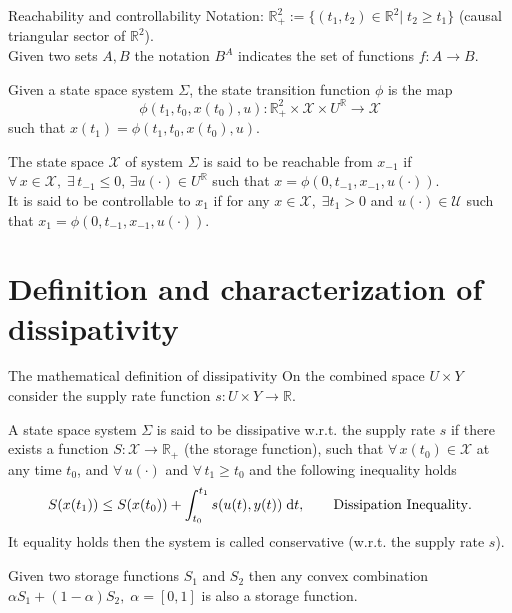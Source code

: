 \documentclass[aspectratio=169]{beamer}
\newcommand{\bbR}{\mathbb{R}}
\begin{document}
\begin{frame}{Reachability and controllability}
	Notation:
	$\bbR^2_+:=\{(t_1, t_2) \in \bbR^2 |\;  t_2\ge t_1\}$ (causal triangular sector of $\bbR^2$). \\
	Given two sets $A, B$ the notation $B^A$ indicates the set of functions $f: A \rightarrow B$. \\
	\begin{definition}
		Given a state space system $\Sigma$, the state transition function $\phi$ is the map 
		\begin{equation*}
			\phi(t_1, t_0, x(t_0), u) : \bbR_+^2 \times \mathcal{X} \times U^\bbR \rightarrow \mathcal{X}
		\end{equation*}
		such that $x(t_1) = \phi(t_1, t_0, x(t_0), u)$.
	\end{definition}
	\begin{definition}
		The state space $\mathcal{X}$ of system $\Sigma$ is said to be reachable
		from $x_{-1}$ if \\
		$\forall \, x \in \mathcal{X}, \; \exists\,  t_{-1} \le 0, \, \exists u(\cdot) \in U^\bbR$ such that $x = \phi(0, t_{-1}, x_{-1}, u(\cdot))$. \\
		It is said to be controllable to $x_1$ if for any $x \in \mathcal{X}, \; \exists t_1 > 0$ and $u(\cdot) \in \mathcal{U}$ such that $x_1 = \phi(0, t_{-1}, x_{-1}, u(\cdot))$.
	\end{definition}
\end{frame}

\section{Definition and characterization of dissipativity}

\begin{frame}{The mathematical definition of dissipativity}
On the combined space $U × Y$ consider the supply rate function $s : U \times Y \rightarrow \bbR$.

\begin{definition}
A state space system $\Sigma$ is said to be dissipative w.r.t. the supply rate $s$ if there exists a function $S : \mathcal{X} \rightarrow \bbR_+$ (the storage function), such
that $\forall \, x(t_0) \in \mathcal{X}$ at any time $t_0$, and $\forall\,  u(\cdot)$ and $\forall\, t_1 \ge t_0$ and the following inequality holds
\begin{equation*}\label{eq:diss_ineq}
	S(x(t_1)) \le S(x(t_0)) + \int_{t_0}^{t_1} s(u(t), y(t)) \d t, \qquad \text{Dissipation Inequality}.
\end{equation*}
It equality holds then the system is called conservative (w.r.t. the supply rate $s$). 
\end{definition}
\begin{corollary}
	Given two storage functions $S_1$ and $S_2$ then any convex combination $\alpha S_1 + (1-\alpha) S_2, \; \alpha=[0,1]$ is also a storage function.
\end{corollary}

\end{frame}
\end{document}
